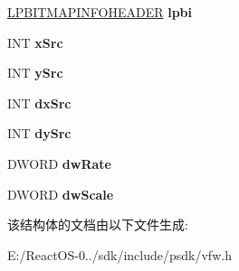 \begin{DoxyCompactItemize}
\hyperlink{struct_b_i_t_m_a_p_i_n_f_o_h_e_a_d_e_r}{L\+P\+B\+I\+T\+M\+A\+P\+I\+N\+F\+O\+H\+E\+A\+D\+ER} {\bfseries lpbi}
\item 
\mbox{\label{struct_i_c_d_r_a_w_b_e_g_i_n_a32698f67dd75bb417aa28ca40f53ad4c}} 
I\+NT {\bfseries x\+Src}
\item 
\mbox{\label{struct_i_c_d_r_a_w_b_e_g_i_n_acb8e41c5a2a156cda22a6d144f57a3f6}} 
I\+NT {\bfseries y\+Src}
\item 
\mbox{\label{struct_i_c_d_r_a_w_b_e_g_i_n_aed0562c3fbc991db44abb1ae90433d09}} 
I\+NT {\bfseries dx\+Src}
\item 
\mbox{\label{struct_i_c_d_r_a_w_b_e_g_i_n_afecebcd53cd691ce12b0c920b74016d3}} 
I\+NT {\bfseries dy\+Src}
\item 
\mbox{\label{struct_i_c_d_r_a_w_b_e_g_i_n_a21ec67d8e5bde52919cdced55ab62e56}} 
D\+W\+O\+RD {\bfseries dw\+Rate}
\item 
\mbox{\label{struct_i_c_d_r_a_w_b_e_g_i_n_aa8ed068ddc2d23371da3060b242ca71b}} 
D\+W\+O\+RD {\bfseries dw\+Scale}
\end{DoxyCompactItemize}


该结构体的文档由以下文件生成\+:\begin{DoxyCompactItemize}
\item 
E\+:/\+React\+O\+S-\/0../sdk/include/psdk/vfw.\+h\end{DoxyCompactItemize}

